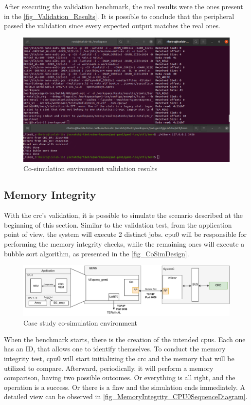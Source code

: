 After executing the validation benchmark, the real results were the ones present in the \autoref{fig_Validation_Results}. It is possible to 
conclude that the peripheral passed the validation since every expected output matches the real ones. 

\begin{figure}[H]
	\centering
 	\includegraphics[width=0.8\linewidth]{Images/Validation_Results.png} 
 	\caption{Co-simulation environment validation results}
	\label{fig_Validation_Results}
\end{figure}


\subsection{Memory Integrity}

With the \gls{crc}'s validation, it is possible to simulate the scenario described at the beginning of this section. 
Similar to the validation test, 
from the application point of view, the system will execute 2 distinct jobs. \gls{cpu}0 will be responsible for 
performing the memory integrity checks, while the remaining ones will execute a bubble sort algorithm, as presented in 
the \autoref{fig_CoSimDesign}.

\begin{figure}[H]
	\centering
 	\includegraphics[width=1\linewidth]{Images/CoSimDesign.png}
 	\caption{Case study co-simulation environment}
	 \label{fig_CoSimDesign}
\end{figure}

When the benchmark starts, there is the creation of the intended \glspl{cpu}. Each one has an ID, that allows one to identify
themselves. To conduct the memory integrity test, \gls{cpu}0 will start initializing the \gls{crc} and the memory that will 
be utilized to compare. Afterward, periodically, it will perform a memory comparison, having two possible outcomes. Or everything
is all right, and the operation is a success. Or there is a flaw and the simulation ends immediately. A detailed view can be 
observed in \ref{fig_MemoryIntegrity_CPU0SequenceDiagram}. 

